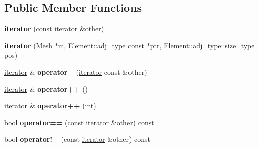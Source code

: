 \subsection*{Public Member Functions}
\begin{DoxyCompactItemize}
\item 
\hypertarget{classINMOST_1_1ElementSet_1_1iterator_abd901954acf75dadbc21d3055c1445fc}{{\bfseries iterator} (const \hyperlink{classINMOST_1_1ElementSet_1_1iterator}{iterator} \&other)}\label{classINMOST_1_1ElementSet_1_1iterator_abd901954acf75dadbc21d3055c1445fc}

\item 
\hypertarget{classINMOST_1_1ElementSet_1_1iterator_ad546d6e0d76dbaab79b6a050d7918f87}{{\bfseries iterator} (\hyperlink{classINMOST_1_1Mesh}{Mesh} $\ast$m, Element\-::adj\-\_\-type const $\ast$ptr, Element\-::adj\-\_\-type\-::size\-\_\-type pos)}\label{classINMOST_1_1ElementSet_1_1iterator_ad546d6e0d76dbaab79b6a050d7918f87}

\item 
\hypertarget{classINMOST_1_1ElementSet_1_1iterator_ac851c2637c04619990753cab1434dc6f}{\hyperlink{classINMOST_1_1ElementSet_1_1iterator}{iterator} \& {\bfseries operator=} (\hyperlink{classINMOST_1_1ElementSet_1_1iterator}{iterator} const \&other)}\label{classINMOST_1_1ElementSet_1_1iterator_ac851c2637c04619990753cab1434dc6f}

\item 
\hypertarget{classINMOST_1_1ElementSet_1_1iterator_a43c2cb20dfc4456275adefd86eb84512}{\hyperlink{classINMOST_1_1ElementSet_1_1iterator}{iterator} \& {\bfseries operator++} ()}\label{classINMOST_1_1ElementSet_1_1iterator_a43c2cb20dfc4456275adefd86eb84512}

\item 
\hypertarget{classINMOST_1_1ElementSet_1_1iterator_a4ade6c619b505f13450b71684315ee85}{\hyperlink{classINMOST_1_1ElementSet_1_1iterator}{iterator} \& {\bfseries operator++} (int)}\label{classINMOST_1_1ElementSet_1_1iterator_a4ade6c619b505f13450b71684315ee85}

\item 
\hypertarget{classINMOST_1_1ElementSet_1_1iterator_a79b0b3742d6ba4a5a23b424780dc1f44}{bool {\bfseries operator==} (const \hyperlink{classINMOST_1_1ElementSet_1_1iterator}{iterator} \&other) const }\label{classINMOST_1_1ElementSet_1_1iterator_a79b0b3742d6ba4a5a23b424780dc1f44}

\item 
\hypertarget{classINMOST_1_1ElementSet_1_1iterator_a0d7ecf1ebc0bf7d3056997a482339316}{bool {\bfseries operator!=} (const \hyperlink{classINMOST_1_1ElementSet_1_1iterator}{iterator} \&other) const }\label{classINMOST_1_1ElementSet_1_1iterator_a0d7ecf1ebc0bf7d3056997a482339316}


\end{DoxyCompactItemize}
